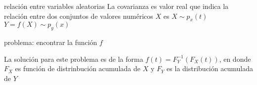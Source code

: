\documentclass{article}
\begin{document}
relación entre variables aleatorias La covarianza es valor real que
indica la relación entre dos conjuntos de valores numéricos $X$ es
$X\sim p_x(t)$ $Y = f(X)\sim p_y(x)$

problema: encontrar la función $f$

La solución para este problema es de la forma $f(t) =
F^{-1}_Y(F_X(t))$, en donde $F_X$ es función de distrinbución
acumulada de $X$ y $F_Y$ es la distribución acumulada de $Y$
\end{document}
